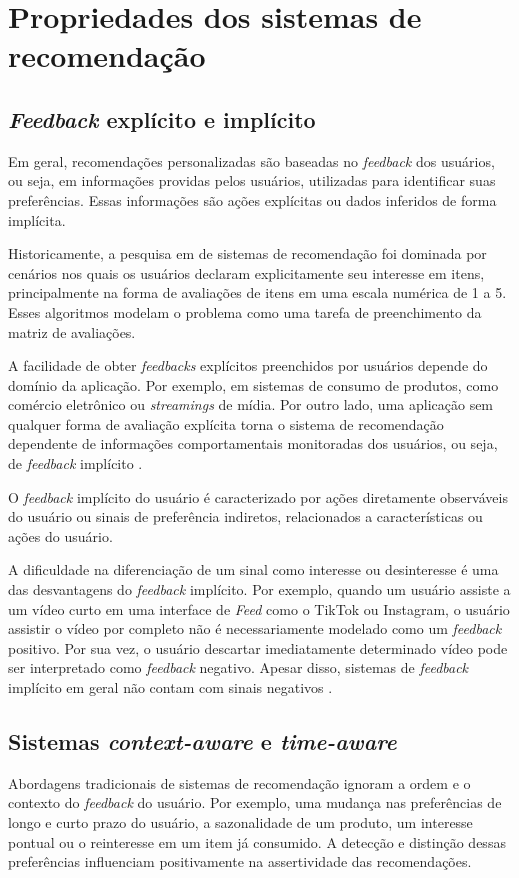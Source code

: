 \section{Propriedades dos sistemas de recomendação}
\subsection{\textit{Feedback} explícito e implícito}

Em geral, recomendações personalizadas são baseadas no \textit{feedback} dos
usuários, ou seja, em informações providas pelos usuários, utilizadas para
identificar suas preferências. Essas informações são ações explícitas ou dados
inferidos de forma implícita.

Historicamente, a pesquisa em de sistemas de recomendação foi dominada por
cenários nos quais os usuários declaram explicitamente seu interesse em itens,
principalmente na forma de avaliações de itens em uma escala numérica de 1 a 5.
Esses algoritmos modelam o problema como uma tarefa de preenchimento da matriz
de avaliações.

A facilidade de obter \textit{feedbacks} explícitos preenchidos por usuários
depende do domínio da aplicação. Por exemplo, em sistemas de consumo de
produtos, como comércio eletrônico ou \textit{streamings} de mídia. Por outro
lado, uma aplicação sem qualquer forma de avaliação explícita torna o sistema de
recomendação dependente de informações comportamentais monitoradas dos usuários,
ou seja, de \textit{feedback} implícito \cite{ludewig2020advances}.

O \textit{feedback} implícito do usuário é caracterizado por ações diretamente
observáveis do usuário ou sinais de preferência indiretos, relacionados a
características ou ações do
usuário.

A dificuldade na diferenciação de um sinal como interesse ou desinteresse é uma
das desvantagens do \textit{feedback} implícito. Por exemplo, quando um usuário
assiste a um vídeo curto em uma interface de \textit{Feed} como o TikTok ou
Instagram, o usuário assistir o vídeo por completo não é necessariamente
modelado como um \textit{feedback} positivo. Por sua vez, o usuário descartar
imediatamente determinado vídeo pode ser interpretado como \textit{feedback}
negativo. Apesar disso, sistemas de \textit{feedback} implícito em geral não contam
com sinais negativos \cite{ludewig2020advances,JLZ18}.

\subsection{Sistemas \textit{context-aware} e \textit{time-aware}} Abordagens
tradicionais de sistemas de recomendação ignoram a ordem e o contexto do
\textit{feedback} do usuário. Por exemplo, uma mudança nas preferências de longo
e curto prazo do usuário, a sazonalidade de um produto, um interesse pontual ou
o reinteresse em um item já consumido. A detecção e distinção dessas
preferências influenciam positivamente na assertividade das recomendações.

